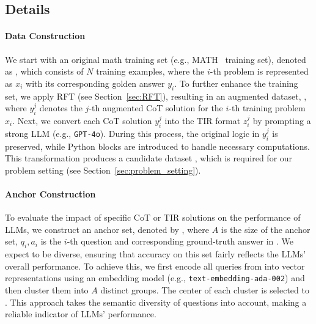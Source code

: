 \subsection{{\method} Details}\label{sec:method_details}

\paragraph{Data Construction}
We start with an original math training set (e.g., MATH~\citep{MATH2021hendrycks} training set), denoted as {\dorige}, which consists of $N$ training examples, where the $i$-th problem is represented as $x_i$ with its corresponding golden answer $y_i$. 
To further enhance the training set, we apply RFT (see Section~\ref{sec:RFT}), resulting in an augmented dataset, {\dauge}, where $y_i^j$ denotes the $j$-th augmented CoT solution for the $i$-th training problem $x_i$. 
Next, we convert each CoT solution $y_i^j$ into the TIR format $z_i^j$ by prompting a strong LLM (e.g., \texttt{GPT-4o}). 
During this process, the original logic in $y_i^j$ is preserved, while Python blocks are introduced to handle necessary computations. 
This transformation produces a candidate dataset {\dde}, which is required for our problem setting (see Section~\ref{sec:problem_setting}).


\paragraph{Anchor Construction}
To evaluate the impact of specific CoT or TIR solutions on the performance of LLMs, we construct an anchor set, denoted by {\danchore}, where $A$ is the size of the anchor set, $q_i, a_i$ is the $i$-th question and corresponding ground-truth answer in {\danchor}.
We expect {\danchor} to be diverse, ensuring that accuracy on this set fairly reflects the LLMs' overall performance.
To achieve this, we first encode all queries from {\dorig} into vector representations using an embedding model (e.g., \texttt{text-embedding-ada-002}) and then cluster them into $A$ distinct groups.
The center of each cluster is selected to {\danchor}.
This approach takes the semantic diversity of questions into account, making {\danchor} a reliable indicator of LLMs' performance.




